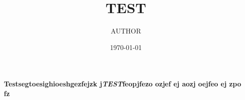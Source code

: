 \documentclass[pdftex,12pt,a4paper]{report}
\title{TEST}
\author{AUTHOR}
\date{\today}
\begin{document}
\maketitle


\paragraph{Testsegtoesighioeshgezfejzk j\emph{TEST}feopjfezo ozjef ej aozj oejfeo ej zpo fz}
\end{document}
